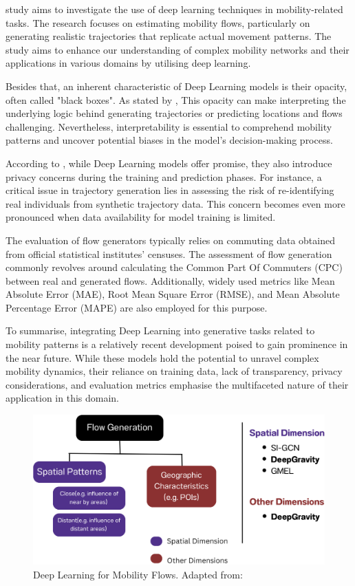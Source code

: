     \cite{lucaSurveyDeepLearning2021} study aims to investigate the use of deep learning techniques in mobility-related tasks. The research focuses on estimating mobility flows, particularly on generating realistic trajectories that replicate actual movement patterns. The study aims to enhance our understanding of complex mobility networks and their applications in various domains by utilising deep learning.

    Besides that, an inherent characteristic of Deep Learning models is their opacity, often called "black boxes". As stated by \cite{lucaSurveyDeepLearning2021}, This opacity can make interpreting the underlying logic behind generating trajectories or predicting locations and flows challenging. Nevertheless, interpretability is essential to comprehend mobility patterns and uncover potential biases in the model's decision-making process.
        
    According to \cite{lucaSurveyDeepLearning2021}, while Deep Learning models offer promise, they also introduce privacy concerns during the training and prediction phases. For instance, a critical issue in trajectory generation lies in assessing the risk of re-identifying real individuals from synthetic trajectory data. This concern becomes even more pronounced when data availability for model training is limited.
        
    The evaluation of flow generators typically relies on commuting data obtained from official statistical institutes' censuses. The assessment of flow generation commonly revolves around calculating the Common Part Of Commuters (CPC) between real and generated flows. Additionally, widely used metrics like Mean Absolute Error (MAE), Root Mean Square Error (RMSE), and Mean Absolute Percentage Error (MAPE) are also employed for this purpose.
        
    To summarise, integrating Deep Learning into generative tasks related to mobility patterns is a relatively recent development poised to gain prominence in the near future. While these models hold the potential to unravel complex mobility dynamics, their reliance on training data, lack of transparency, privacy considerations, and evaluation metrics emphasise the multifaceted nature of their application in this domain.   

    \begin{figure}[H]
        \centering
        \includegraphics[width=12cm]{Images/deepgravity_fig.png}
        \caption{Deep Learning for Mobility Flows. Adapted from: \cite{lucaSurveyDeepLearning2021}}
        \label{fig: DG evaluation}
    \end{figure}


